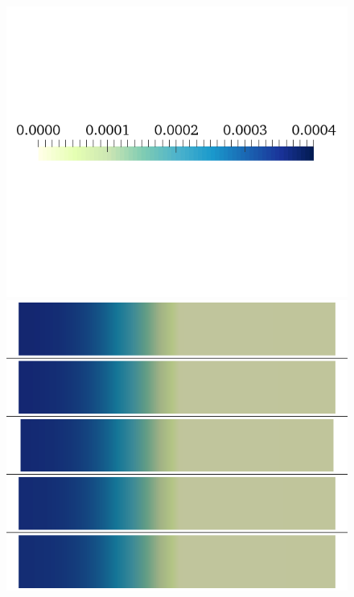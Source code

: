 \documentclass{article}
\begin{document}
%
\begin{figure}
\begin{minipage}{0.5\textwidth}
\includegraphics[trim=0cm 7cm 0cm 6cm, clip=true, width=1\linewidth]{legend_cai}
\includegraphics[trim=0cm 0cm 0cm 0cm, clip=true, width=1\linewidth]{cai_gkr}
    \end{minipage}
    \begin{minipage}{0.5\textwidth}

\end{minipage}
\end{figure}
\end{document}
